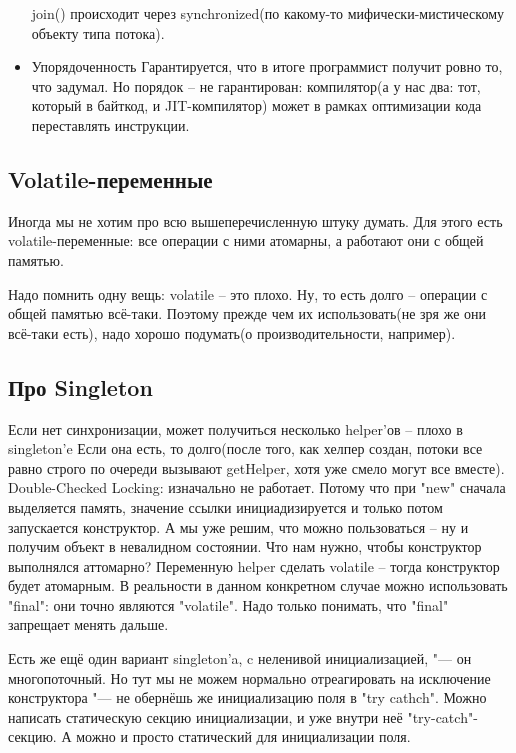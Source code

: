 \begin{itemize}
	join() происходит через synchronized(по какому-то мифически-мистическому объекту типа потока).


	\item{Упорядоченность}
		Гарантируется, что в итоге программист получит ровно то, что задумал. Но порядок -- не гарантирован:
		компилятор(а у нас два: тот, который в байткод, и JIT-компилятор) может в рамках оптимизации кода переставлять инструкции.
	\end{itemize}
	
\subsection{Volatile-переменные}
	Иногда мы не хотим про всю вышеперечисленную штуку думать. Для этого есть volatile-переменные: все операции с ними атомарны,
	а работают они с общей памятью.

	Надо помнить одну вещь: volatile -- это плохо. %
	Ну, то есть долго -- операции с общей памятью всё-таки. Поэтому прежде чем их использовать(не зря же они всё-таки есть),
	надо хорошо подумать(о производительности, например).

\subsection{Про Singleton}
	Если нет синхронизации, может получиться несколько helper'ов -- плохо в singleton'e
	Если она есть, то долго(после того, как хелпер создан, потоки все равно строго по очереди вызывают getHelper, хотя
	уже смело могут все вместе).
	Double-Checked Locking: изначально не работает. Потому что при \java"new" сначала выделяется память,
	значение ссылки инициадизируется и только потом запускается конструктор. А мы уже решим, что можно пользоваться -- ну и получим
	объект в невалидном состоянии. Что нам нужно, чтобы конструктор выполнялся аттомарно? Переменную helper сделать volatile -- тогда
	конструктор будет атомарным.
	В реальности в данном конкретном случае можно использовать \java"final": они точно являются \java"volatile".
	Надо только понимать, что \java"final" запрещает менять дальше.

	Есть же ещё один вариант singleton'a, c неленивой инициализацией, "--- он многопоточный. Но тут мы не можем 
	нормально отреагировать на исключение конструктора "--- не обернёшь же инициализацию поля в \java"try cathch".
	Можно написать статическую секцию инициализации, и уже внутри неё \java"try-catch"-секцию. А можно и просто статический 
	для инициализации поля.

